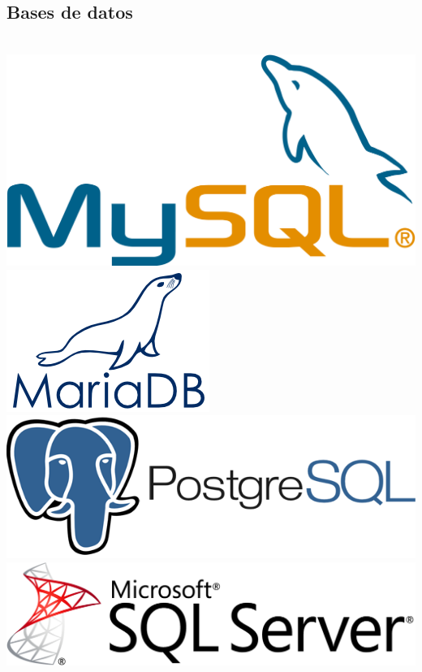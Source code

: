 \documentclass[]{friggeri-cv}
\begin{document}
\begin{aside}
    \section{Bases de datos}
    ~
    \includegraphics[scale=0.04]{img/mysql.png}
    \includegraphics[scale=0.30]{img/mariadb.png}
    ~
    \includegraphics[scale=0.15]{img/postgresql.png}
    \includegraphics[scale=0.1]{img/sqlserver.png}
    ~

\end{aside}
\end{document}
